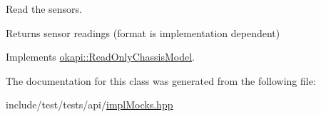 Read the sensors. 

\begin{DoxyReturn}{Returns}
sensor readings (format is implementation dependent) 
\end{DoxyReturn}


Implements \mbox{\hyperlink{classokapi_1_1ReadOnlyChassisModel_af2d844d9e12bb7c778ac9a5a0074f848}{okapi\+::\+Read\+Only\+Chassis\+Model}}.



The documentation for this class was generated from the following file\+:\begin{DoxyCompactItemize}
\item 
include/test/tests/api/\mbox{\hyperlink{implMocks_8hpp}{impl\+Mocks.\+hpp}}\end{DoxyCompactItemize}
